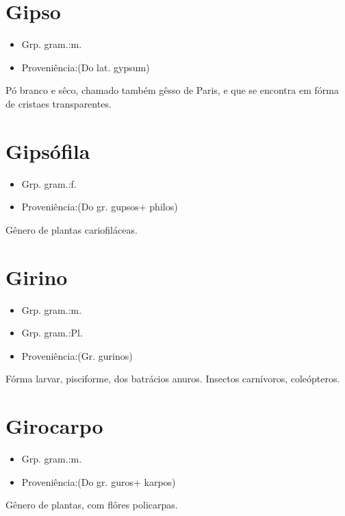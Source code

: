 \section{Gipso}
\begin{itemize}
\item {Grp. gram.:m.}
\end{itemize}
\begin{itemize}
\item {Proveniência:(Do lat. \textunderscore gypsum\textunderscore )}
\end{itemize}
Pó branco e sêco, chamado também \textunderscore gêsso de Paris\textunderscore , e que se encontra em fórma de cristaes transparentes.
\section{Gipsófila}
\begin{itemize}
\item {Grp. gram.:f.}
\end{itemize}
\begin{itemize}
\item {Proveniência:(Do gr. \textunderscore gupsos\textunderscore  + \textunderscore philos\textunderscore )}
\end{itemize}
Gênero de plantas cariofiláceas.
\section{Girino}
\begin{itemize}
\item {Grp. gram.:m.}
\end{itemize}
\begin{itemize}
\item {Grp. gram.:Pl.}
\end{itemize}
\begin{itemize}
\item {Proveniência:(Gr. \textunderscore gurinos\textunderscore )}
\end{itemize}
Fórma larvar, pisciforme, dos batrácios anuros.
Insectos carnívoros, coleópteros.
\section{Girocarpo}
\begin{itemize}
\item {Grp. gram.:m.}
\end{itemize}
\begin{itemize}
\item {Proveniência:(Do gr. \textunderscore guros\textunderscore  + \textunderscore karpos\textunderscore )}
\end{itemize}
Gênero de plantas, com flôres policarpas.

